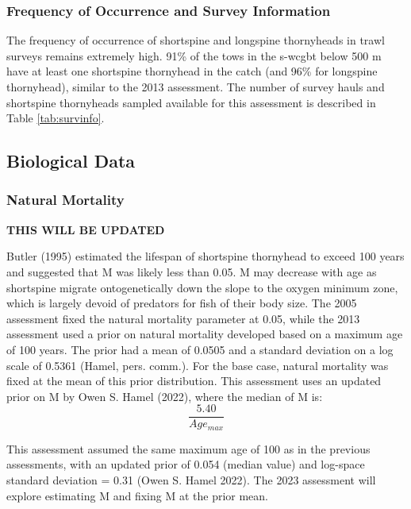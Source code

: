 \documentclass[11pt,
  english,
  letterpaper,
]{article}
\begin{document}
\hypertarget{frequency-of-occurrence-and-survey-information}{%
\subsubsection{Frequency of Occurrence and Survey Information}\label{frequency-of-occurrence-and-survey-information}}

The frequency of occurrence of shortspine and longspine thornyheads in trawl surveys remains extremely high. 91\% of the tows in the \gls{s-wcgbt} below 500 m have at least one shortspine thornyhead in the catch (and 96\% for longspine thornyhead), similar to the 2013 assessment. The number of survey hauls and shortspine thornyheads sampled available for this assessment is described in Table \ref{tab:survinfo}.

\hypertarget{biological-data}{%
\subsection{Biological Data}\label{biological-data}}

\hypertarget{natural-mortality}{%
\subsubsection{Natural Mortality}\label{natural-mortality}}

\textbf{THIS WILL BE UPDATED}

Butler (1995) estimated the lifespan of shortspine thornyhead to exceed 100 years and suggested that M was likely less than 0.05. M may decrease with age as shortspine migrate ontogenetically down the slope to the oxygen minimum zone, which is largely devoid of predators for fish of their body size. The 2005 assessment fixed the natural mortality parameter at 0.05, while the 2013 assessment used a prior on natural mortality developed based on a maximum age of 100 years. The prior had a mean of 0.0505 and a standard deviation on a log scale of 0.5361 (Hamel, pers. comm.). For the base case, natural mortality was fixed at the mean of this prior distribution. This assessment uses an updated prior on M by Owen S. Hamel (2022), where the median of M is: \begin{equation} \frac{5.40}{Age_{max}} \end{equation}

This assessment assumed the same maximum age of 100 as in the previous assessments, with an updated prior of 0.054 (median value) and log-space standard deviation = 0.31 (Owen S. Hamel 2022). The 2023 assessment will explore estimating M and fixing M at the prior mean.
\end{document}
